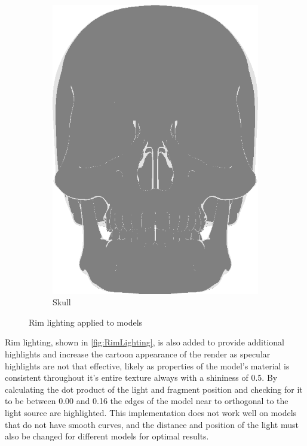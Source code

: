 \begin{figure}[h]
\begin{subfigure}[b]{0.22\textwidth}
    \includegraphics[width=\textwidth]{img/Lighting/RimSkull.png}
    \caption{Skull}
    \label{fig:RimSkull}
\end{subfigure}
\caption{Rim lighting applied to models}
\label{fig:RimLighting}
\end{figure} 

Rim lighting, shown in \autoref{fig:RimLighting}, is also added to provide additional highlights and increase the cartoon appearance 
of the render as specular highlights are not that effective, likely as properties of the model's 
material is consistent throughout it's entire texture always with a shininess of 0.5. By calculating the dot product of the light and fragment position and checking for it to be between 0.00 and 0.16 the edges of the model near to orthogonal to the light source are highlighted. This implementation 
does not work well on  models that do not have smooth curves, and the distance and position of the 
light must also be changed for different models for optimal results. 

